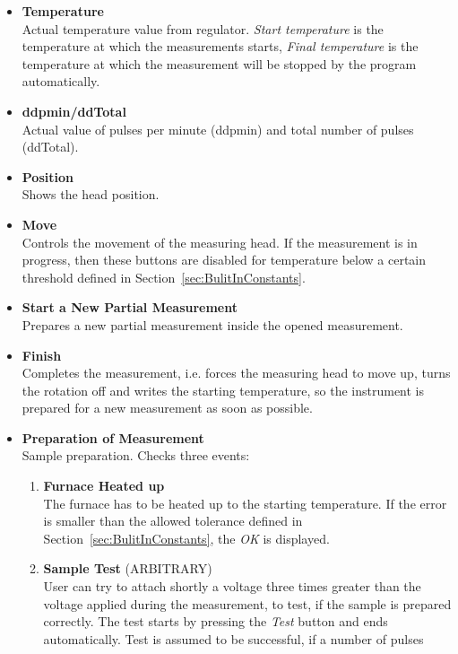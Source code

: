 \documentclass[a4paper,11pt,oneside]{report}
\theoremstyle{named}
\begin{document}
\begin{itemize}
  \item \textbf{Temperature} \\
    Actual temperature value from regulator. \textit{Start temperature} is the
    temperature at which the measurements starts, \textit{Final temperature} is
    the temperature at which the measurement will be stopped by the program
    automatically.
  \item \textbf{ddpmin/ddTotal} \\
    Actual value of pulses per minute (ddpmin) and total number of pulses
    (ddTotal).
  \item \textbf{Position} \\
    Shows the head position.
  \item \textbf{Move} \\
    Controls the movement of the measuring head. If the measurement is in
    progress, then these buttons are disabled for temperature below a certain
    threshold defined in Section~\ref{sec:BulitInConstants}.
  \item \textbf{Start a New Partial Measurement} \\
    Prepares a new partial measurement inside the opened measurement. 
  \item \textbf{Finish} \\
    Completes the measurement, i.e. forces the measuring head to move up, turns
    the rotation off and writes the starting temperature, so the instrument is
    prepared for a new measurement as soon as possible. 
  \item \textbf{Preparation of Measurement} \\
    Sample preparation. Checks three events:
    \begin{enumerate}
      \item \textbf{Furnace Heated up} \\
        The furnace has to be heated up to the starting temperature. If the
        error is smaller than the allowed tolerance defined in
        Section~\ref{sec:BulitInConstants}, the \textit{OK} is displayed.
      \item \textbf{Sample Test} (ARBITRARY) \\
        User can try to attach shortly a voltage three times greater than the
        voltage applied during the measurement, to test, if the sample is prepared
        correctly. The test starts by pressing the \textit{Test} button and ends
        automatically. Test is assumed to be successful, if a number of pulses

\end{enumerate}
\end{itemize}
\end{document}
